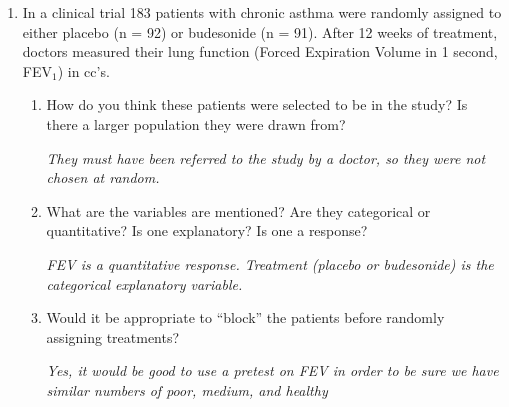 \begin{enumerate}
\begin{enumerate}
\begin{students}
        \vfill
\end{students}
\begin{key}
 {\it Observational study}
\end{key}
    \item What would be your scope of inference?
\begin{students}
        \vfill
\end{students}
\begin{key}
 {\it We will not be able to say that gender causes who would seek
   help at MSU SHS because we did not randomly assign gender.  If you
   randomly selected students from the MSU population, then we can
   extend the inference back to the population. Otherwise, it's just
   valid within the sample.}
\end{key}

    \end{enumerate}

  \item In a clinical trial 183 patients with chronic asthma were
    randomly assigned  to either placebo (n = 92) or budesonide (n = 91). After 12 weeks
    of treatment, doctors measured their lung function (Forced
    Expiration Volume in 1 second, FEV$_1$) in cc's.      
   \begin{enumerate}
    \item How do you think these patients were selected to be in the
      study? Is there a larger population they were drawn from?
\begin{students}
        \vspace*{\fill} \newpage
\end{students}
\begin{key}
 {\it They must have been referred to the study by a doctor, so they
   were not chosen at random.}
\end{key}

    \item What are the variables are mentioned?
      Are they categorical or quantitative? Is one explanatory? Is one a response?
\begin{students}
        \vfill
\end{students}
\begin{key}
 {\it FEV is a quantitative response. Treatment (placebo or
   budesonide) is the categorical explanatory variable. }
\end{key}

    \item Would it be appropriate to ``block'' the patients before
      randomly assigning treatments?\begin{students}
        \vfill
\end{students}
\begin{key}
 {\it Yes, it would be good to use a pretest on FEV in order to be
   sure we have similar numbers of poor, medium, and healthy}
\end{key}


\end{enumerate}
\end{enumerate}
